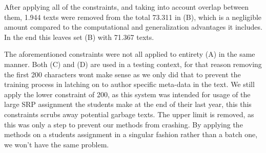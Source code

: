 After applying all of the constraints, and taking into account
overlap between them, 1.944 texts were removed from the total 73.311 in (B),
which is a negligible amount compared to the computational and generalization
advantages it includes.
In the end this leaves set (B) with 71.367 texts.

The aforementioned constraints were not all applied to entirety (A) in the same
manner. Both (C) and (D) are used in a testing context, for that reason removing
the first 200 characters wont make sense as we only did that to prevent the
training process in latching on to author specific meta-data in the text. We
still apply the lower constraint of 200, as this system was intended for usage
of the large SRP assignment the students make at the end of their last year,
this this constraints scrubs away potential garbage texts. The upper limit
is removed, as this was only a step to prevent our methods from crashing. By
applying the methods on a students assignment in a singular fashion rather than
a batch one, we won't have the same problem.

